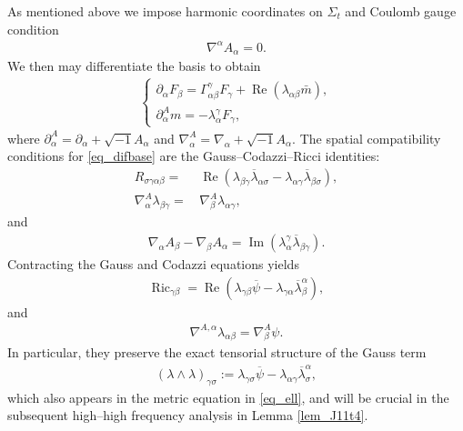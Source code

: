 \documentclass[11pt,letterpaper,reqno]{amsart}
\numberwithin{equation}{section}
\theoremstyle{definition}
\theoremstyle{remark}
\begin{document}
 As mentioned above we impose harmonic
coordinates on $\Sigma_t$ and Coulomb gauge condition
\begin{align}
\nabla^\alpha A_\alpha=0.
\label{Coulomb_gauge}
\end{align}
We then may differentiate the basis to obtain
\begin{align} \label{eq_difbase}
	\begin{cases}
	\partial_\alpha F_\beta=\Gamma_{\alpha \beta}^\gamma F_\gamma+\operatorname{Re}\left(\lambda_{\alpha \beta} \bar{m}\right), \\
	\partial_\alpha^A m=-\lambda_\alpha^\gamma F_\gamma,
\end{cases}
\end{align}
where $\partial_\alpha^A=\partial_\alpha+\sqrt{-1} A_\alpha$ and $\nabla_\alpha^A =\nabla_\alpha+\sqrt{-1} A_\alpha$. The spatial compatibility conditions for \eqref{eq_difbase} are the
Gauss--Codazzi--Ricci identities:
\begin{align}
R_{\sigma\gamma\alpha\beta}
=&\,
\operatorname{Re}
\left(
\lambda_{\beta\gamma}\overline{\lambda}_{\alpha\sigma}
-
\lambda_{\alpha\gamma}\overline{\lambda}_{\beta\sigma}
\right),
\label{eq:gauss-complex}\\
\nabla_\alpha^A\lambda_{\beta\gamma}
=&\,
\nabla_\beta^A\lambda_{\alpha\gamma},
\label{eq:codazzi-complex}
\end{align}
and
\begin{align}
\nabla_\alpha A_\beta-\nabla_\beta A_\alpha
=
\operatorname{Im}
\left(
\lambda_\alpha^{\gamma}
\overline{\lambda}_{\beta\gamma}
\right).
\label{eq:ricci-normal}
\end{align}
Contracting the Gauss and Codazzi equations yields
\begin{align}
\operatorname{Ric}_{\gamma\beta}
=
\operatorname{Re}
\left(
\lambda_{\gamma\beta}\overline\psi
-
\lambda_{\gamma\alpha}
\overline{\lambda}^\alpha_{\beta}
\right),
\label{eq:ricci-gauss}
\end{align}
and
\begin{align}
\nabla^{A,\alpha}\lambda_{\alpha\beta}
=
\nabla_\beta^A\psi.
\label{eq:codazzi-contracted}
\end{align}
In particular,
they preserve the exact tensorial structure of the Gauss term
\begin{align}
   (\lambda\wedge\lambda)_{\gamma\sigma}:= \lambda_{\gamma\sigma}\overline\psi
-
\lambda_{\alpha\gamma}
\overline{\lambda}^\alpha_{\sigma}, \label{wed.lam}
\end{align}
which also appears in the metric equation in \eqref{eq_ell}, and will be crucial in the subsequent high--high frequency analysis in Lemma \ref{lem_J11t4}.
\end{document}
